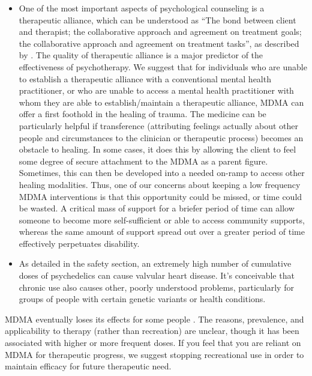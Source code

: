 \documentclass[12pt,letterpaper]{book}
\begin{document}
\begin{itemize}
    \item One of the most important aspects of psychological counseling is a therapeutic alliance, which can be understood as “The bond between client and therapist; the collaborative approach and agreement on treatment goals; the collaborative approach and agreement on treatment tasks”, as described by \textcite{BRWAIdownload}. The quality of therapeutic alliance is a major predictor of the effectiveness of psychotherapy. We suggest that for individuals who are unable to establish a therapeutic alliance with a conventional mental health practitioner, or who are unable to access a mental health practitioner with whom they are able to establish/maintain a therapeutic alliance, MDMA can offer a first foothold in the healing of trauma. The medicine can be particularly helpful if transference (attributing feelings actually about other people and circumstances to the clinician or therapeutic process) becomes an obstacle to healing. In some cases, it does this by allowing the client to feel some degree of secure attachment to the MDMA as a parent figure. Sometimes, this can then be developed into a needed on-ramp to access other healing modalities. Thus, one of our concerns about keeping a low frequency MDMA interventions is that this opportunity could be missed, or time could be wasted. A critical mass of support for a briefer period of time can allow someone to become more self-sufficient or able to access community supports, whereas the same amount of support spread out over a greater period of time effectively perpetuates disability.
    \item As detailed in the safety section, an extremely high number of cumulative doses of psychedelics can cause valvular heart disease. It's conceivable that chronic use also causes other, poorly understood problems, particularly for groups of people with certain genetic variants or health conditions.
\end{itemize}

MDMA eventually loses its effects for some people \cite{farreTolerance,parrottTolerance}. The reasons, prevalence, and applicability to therapy (rather than recreation) are unclear, though it has been associated with higher or more frequent doses. If you feel that you are reliant on MDMA for therapeutic progress, we suggest stopping recreational use in order to maintain efficacy for future therapeutic need.
\end{document}
